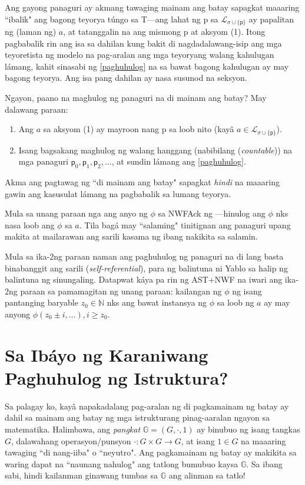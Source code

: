 \documentclass{article}
\begin{document}
Ang gayong panaguri ay akmang tawaging mainam ang batay sapagkat maaaring ``ibalik" ang bagong teyorya túngo sa \textsf{T}---ang lahat ng \textsf{p} sa $\mathcal{L}_{\sigma \cup \{\textsf{p}\}}$ ay papalitan ng (laman ng) $a$, at tatanggalin na ang mismong \textsf{p} at aksyom (1). Itong pagbabalik rin ang isa sa dahilan kung bakit di nagdadalawang-isip ang mga teyoretista ng modelo na pag-aralan ang mga teyoryang walang kahulugan lámang, kahit sinasabi ng \ref{paghuhulog} na sa bawat bagong kahulugan ay may bagong teyorya. Ang isa pang dahilan ay nasa susunod na seksyon.

Ngayon, paano na maghulog ng panaguri na di mainam ang batay? May dalawang paraan:

\begin{enumerate}
\item Ang $a$ sa aksyom (1) ay mayroon nang \textsf{p} sa loob nito (kayâ $a \in \mathcal{L}_{\sigma \cup \{\textsf{p}\}}$).
\item Isang bagsakang maghulog ng walang hanggang (nabibilang (\textit{countable})) na mga panaguri $\textsf{p}_{0}, \textsf{p}_{1}, \textsf{p}_{2}, \ldots$, at sundin lámang ang \ref{paghuhulog}.
\end{enumerate}

\noindent Akma ang pagtawag ng ``di mainam ang batay" sapagkat \textit{hindi} na maaaring gawin ang kasusulat lámang na pagbabalik sa lumang teyorya.

Mula sa unang paraan nga ang anyo ng $\phi$ sa \textsf{NWFAck} ng \cite{ast-nwf}---hinulog ang $\phi$ nks nasa loob ang $\phi$ sa $a$. Tila bagá may ``salaming" tinitignan ang panaguri upang makita at mailarawan ang sarili kasama ng ibang nakikita sa salamin.

Mula sa ika-2ng paraan naman ang paghuhulog ng panaguri na di lang basta binabanggit ang sarili (\textit{self-referential}), para ng balintuna ni Yablo\cite{yablo} sa halip ng balintuna ng sinungaling. Datapwat káya pa rin ng \textsf{AST+NWF} na iwari ang ika-2ng paraan sa pamamagitan ng unang paraan: kailangan ng $\phi$ ng isang pantanging baryable $z_0\in\mathbb{N}$ nks ang bawat instansya ng $\phi$ sa loob ng $a$ ay may anyong $\phi(z_0 \pm i, \ldots), i \ge z_0.$

\section{Sa Ibáyo ng Karaniwang Paghuhulog ng Istruktura?}

Sa palagay ko, kayâ napakadalang pag-aralan ng di pagkamainam ng batay ay dahil sa mainam ang batay ng mga istrukturang pinag-aaralan ngayon sa matematika. Halimbawa, ang \textit{pangkat} $\mathbb{G} = (G, \cdot, 1)$ ay binubuo ng isang tangkas $G$, dalawahang operasyon/punsyon $\cdot:G \times G \rightarrow G$, at isang $1 \in G$ na maaaring tawaging ``di nang-iiba" o ``neyutro". Ang pagkamainam ng batay ay makikita sa waring dapat na ``naunang nahulog" ang tatlong bumubuo kaysa $\mathbb{G}$. Sa ibang sabi, hindi kailanman ginawang tumbas sa $\mathbb{G}$ ang alinman sa tatlo!
\end{document}
